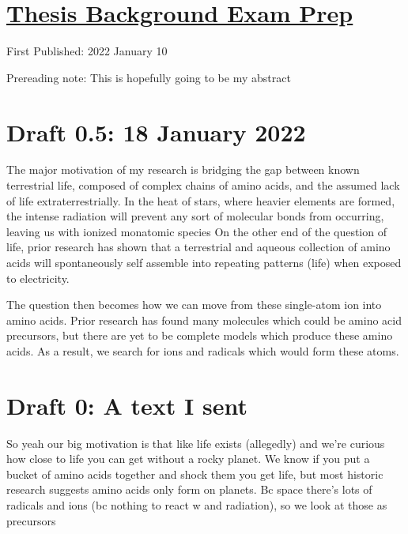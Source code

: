 \documentclass[12pt]{article}[titlepage]
\newcommand{\1}{\={a}}
\newcommand{\2}{\={e}}
\newcommand{\3}{\={\i}}
\newcommand{\4}{\=o}
\newcommand{\5}{\=u}
\newcommand{\6}{\={A}}
\renewcommand{\,}{\textsuperscript{,}}
\begin{document}
\doublespacing
\section{\href{thesis-background-prep-1.html}{Thesis Background Exam Prep}}
First Published: 2022 January 10

Prereading note: This is hopefully going to be my abstract
\section{Draft 0.5: 18 January 2022}
The major motivation of my research is bridging the gap between known terrestrial life, composed of complex chains of amino acids, and the assumed lack of life extraterrestrially.
In the heat of stars, where heavier elements are formed, the intense radiation will prevent any sort of molecular bonds from occurring, leaving us with ionized monatomic species
On the other end of the question of life, prior research has shown that a terrestrial and aqueous collection of amino acids will spontaneously self assemble into repeating patterns (life) when exposed to electricity. 

The question then becomes how we can move from these single-atom ion into amino acids.
Prior research has found many molecules which could be amino acid precursors, but there are yet to be complete models which produce these amino acids.
As a result, we search for ions and radicals which would form these atoms.

\section{Draft 0: A text I sent}
So yeah our big motivation is that like life exists (allegedly) and we're curious how close to life you can get without a rocky planet. We know if you put a bucket of amino acids together and shock them you get life, but most historic research suggests amino acids only form on planets. Bc space there's lots of radicals and ions (bc nothing to react w and radiation), so we look at those as precursors
\end{document}

